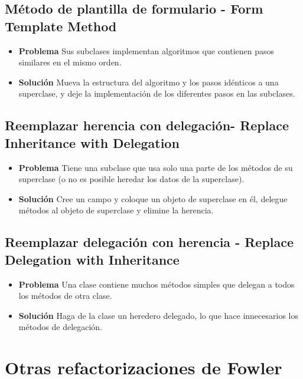 \documentclass[11pt,a4paper,oneside]{book}
\begin{document}
\subsection{Método de plantilla de formulario - Form Template Method}
\label{renombrarmetodo}
\begin{itemize}
    \item \textbf{Problema} Sus subclases implementan algoritmos que contienen pasos similares en el mismo orden.
    \item \textbf{Solución}  Mueva la estructura del algoritmo y los pasos idénticos a una superclase, y deje la implementación de los diferentes pasos en las subclases.
\end{itemize}

\subsection{Reemplazar herencia con delegación- Replace Inheritance with Delegation}
\label{renombrarmetodo}
\begin{itemize}
    \item \textbf{Problema} Tiene una subclase que usa solo una parte de los métodos de su superclase (o no es posible heredar los datos de la superclase).
    \item \textbf{Solución} Cree un campo y coloque un objeto de superclase en él, delegue métodos al objeto de superclase y elimine la herencia.
\end{itemize}

\subsection{Reemplazar delegación con herencia - Replace Delegation with Inheritance}
\label{renombrarmetodo}
\begin{itemize}
    \item \textbf{Problema} Una clase contiene muchos métodos simples que delegan a todos los métodos de otra clase.
    \item \textbf{Solución} Haga de la clase un heredero delegado, lo que hace innecesarios los métodos de delegación.
\end{itemize}


\section{Otras refactorizaciones de Fowler}
\end{document}
